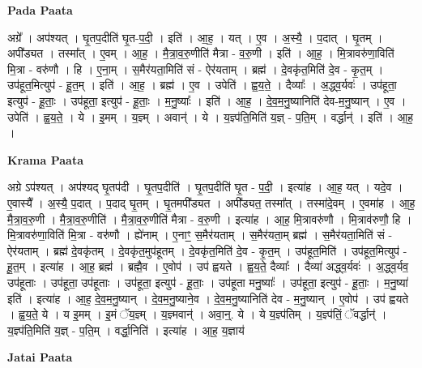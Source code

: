 \documentclass[17pt]{extarticle}
\begin{document}
\textbf{Pada Paata} \newline

अग्रे᳚ । अप॑श्यत् । घृ॒तप॒दीति॑ घृ॒त-प॒दी॒ । इति॑ । आ॒ह॒ । यत् । ए॒व । अ॒स्यै॒ । प॒दात् । घृ॒तम् । अपी᳚ड्यत । तस्मा᳚त् । ए॒वम् । आ॒ह॒ । मै॒त्रा॒व॒रु॒णीति॑ मैत्रा - व॒रु॒णी । इति॑ । आ॒ह॒ । मि॒त्रावरु॑णा॒विति॑ मि॒त्रा - वरु॑णौ । हि । ए॒ना॒म् । स॒मैर॑यता॒मिति॑ सं - ऐर॑यताम् । ब्रह्म॑ । दे॒वकृ॑त॒मिति॑ दे॒व - कृ॒त॒म् । उप॑हूत॒मित्युप॑ - हू॒त॒म् । इति॑ । आ॒ह॒ । ब्रह्म॑ । ए॒व । उपेति॑ । ह्व॒य॒ते॒ । दैव्याः᳚ । अ॒द्ध्व॒र्यवः॑ । उप॑हूता॒ इत्युप॑ - हू॒ताः॒ । उप॑हूता॒ इत्युप॑ - हू॒ताः॒ । म॒नु॒ष्याः᳚ । इति॑ । आ॒ह॒ । दे॒व॒म॒नु॒ष्यानिति॑ देव-म॒नु॒ष्यान् । ए॒व । उपेति॑ । ह्व॒य॒ते॒ । ये । इ॒मम् । य॒ज्ञ्म् । अवान्॑ । ये । य॒ज्ञ्प॑ति॒मिति॑ य॒ज्ञ् - प॒ति॒म् । वर्द्धान्॑ । इति॑ । आ॒ह॒ ।  \newline


\textbf{Krama Paata} \newline

अग्रे ऽप॑श्यत् । अप॑श्यद् घृ॒तप॑दी । घृ॒तप॒दीति॑ । घृ॒तप॒दीति॑ घृ॒त - प॒दी॒ । इत्या॑ह । आ॒ह॒ यत् । यदे॒व । ए॒वास्यै᳚ । अ॒स्यै॒ प॒दात् । प॒दाद् घृ॒तम् । घृ॒तमपी᳚ड्यत । अपी᳚ड्यत॒ तस्मा᳚त् । तस्मा॑दे॒वम् । ए॒वमा॑ह । आ॒ह॒ मै॒त्रा॒व॒रु॒णी । मै॒त्रा॒व॒रु॒णीति॑ । मै॒त्रा॒व॒रु॒णीति॑ मैत्रा - व॒रु॒णी । इत्या॑ह । आ॒ह॒ मि॒त्रावरु॑णौ । मि॒त्राव॑रुणौ॒ हि । मि॒त्रावरु॑णा॒विति॑ मि॒त्रा - वरु॑णौ । ह्ये॑नाम् । ए॒नाꣳ॒॒ स॒मैर॑यताम् । स॒मैर॑यता॒म् ब्रह्म॑ । स॒मैर॑यता॒मिति॑ सं - ऐर॑यताम् । ब्रह्म॑ दे॒वकृ॑तम् । दे॒वकृ॑त॒मुप॑हूतम् । दे॒वकृ॑त॒मिति॑ दे॒व - कृ॒त॒म् । उप॑हूत॒मिति॑ । उप॑हूत॒मित्युप॑ - हू॒त॒म् । इत्या॑ह । आ॒ह॒ ब्रह्म॑ । ब्रह्मै॒व । ए॒वोप॑ । उप॑ ह्वयते । ह्व॒य॒ते॒ दैव्याः᳚ । दैव्या॑ अद्ध्व॒र्यवः॑ । अ॒द्ध्व॒र्यव॒ उप॑हूताः । उप॑हूता॒ उप॑हूताः । उप॑हूता॒ इत्युप॑ - हू॒ताः॒ । उप॑हूता मनु॒ष्याः᳚ । उप॑हूता॒ इत्युप॑ - हू॒ताः॒ । म॒नु॒ष्या॑ इति॑ । इत्या॑ह । आ॒ह॒ दे॒व॒म॒नु॒ष्यान् । दे॒व॒म॒नु॒ष्याने॒व । दे॒व॒म॒नु॒ष्यानिति॑ देव - म॒नु॒ष्यान् । ए॒वोप॑ । उप॑ ह्वयते । ह्व॒य॒ते॒ ये । य इ॒मम् । इ॒मं ॅय॒ज्ञ्म् । य॒ज्ञ्मवान्॑ । अवा॒न्॒. ये । ये य॒ज्ञ्प॑तिम् । य॒ज्ञ्प॑तिं॒ ॅवर्द्धान्॑ । य॒ज्ञ्प॑ति॒मिति॑ य॒ज्ञ् - प॒ति॒म् । वर्द्धा॒निति॑ । इत्या॑ह ।  आ॒ह॒ य॒ज्ञाय॑ \newline

\textbf{Jatai Paata} \newline
\end{document}
